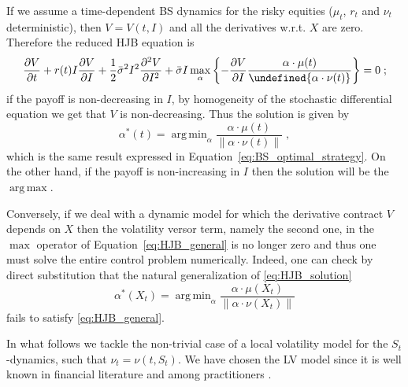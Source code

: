 \documentclass[runningheads]{m2ef}
\DeclareMathOperator*{\argmax}{arg\,max}
\DeclareMathOperator*{\argmin}{arg\,min}
\let\norm\undefined %
\DeclarePairedDelimiter\norm{\lVert}{\rVert}
\begin{document}
	If we assume a time-dependent BS dynamics for the risky equities ($\mu_t$, $r_t$ and $\nu_t$ deterministic), then $V = V(t,I)$ and all the derivatives w.r.t. $X$ are zero. Therefore the reduced HJB equation is
	\begin{equation}
		\frac{\partial V}{\partial t} +  r(t) I \frac{\partial V}{\partial I}  + \frac{1}{2}\bar{\sigma}^2I^2\frac{\partial^2V}{\partial I^2} + \bar{\sigma}I\max_\alpha \left\{ -\frac{\partial V}{\partial I}   \frac{\alpha \cdot \mu(t)}{\norm{\alpha \cdot \nu(t)}}\right\} = 0 \; ;
	\end{equation}
	if the payoff is non-decreasing in $I$, by homogeneity of the stochastic differential equation we get that $V$ is non-decreasing. Thus the solution is given by
	\begin{equation}\label{eq:HJB_solution}
	\alpha^*(t) = \argmin_\alpha \frac{\alpha \cdot \mu(t)}{\|\alpha \cdot \nu(t)\|} \; ,
	\end{equation}
	which is the same result expressed in Equation~\eqref{eq:BS_optimal_strategy}. On the other hand, if the payoff is non-increasing in $I$ then the solution will be the $\argmax$.

	Conversely, if we deal with a dynamic model for which the derivative contract $V$ depends on $X$ then the volatility versor term, namely the second one, in the $\max$ operator of Equation~\eqref{eq:HJB_general} is no longer zero and thus one must solve the entire control problem numerically. Indeed, one can check by direct substitution that the natural generalization of \eqref{eq:HJB_solution}
	\begin{equation}
	\alpha^*(X_t) = \argmin_\alpha \frac{\alpha \cdot \mu(X_t)}{\|\alpha \cdot \nu(X_t)\|}
	\end{equation}
	fails to satisfy \eqref{eq:HJB_general}.

	In what follows we tackle the non-trivial case of a local volatility model for the $S_t$-dynamics, such that $\nu_t = \nu(t,S_t)$. We have chosen the LV model since it is well known in financial literature and among practitioners \cite{Gatheral2006}.
\end{document}
